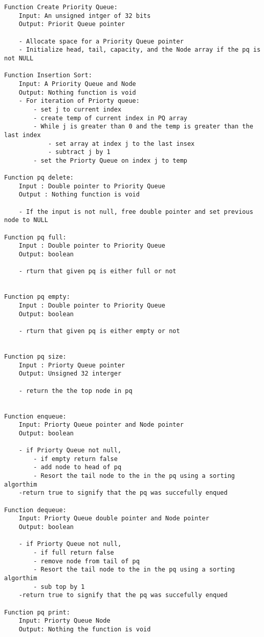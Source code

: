 \documentclass[11pt]{article} %
\begin{document}
\begin{flushleft}
\begin{lstlisting}
Function Create Priority Queue:
    Input: An unsigned intger of 32 bits
    Output: Priorit Queue pointer
    
    - Allocate space for a Priority Queue pointer
    - Initialize head, tail, capacity, and the Node array if the pq is not NULL

Function Insertion Sort:
    Input: A Priority Queue and Node
    Output: Nothing function is void
    - For iteration of Priorty queue:
        - set j to current index
        - create temp of current index in PQ array
        - While j is greater than 0 and the temp is greater than the last index
            - set array at index j to the last insex
            - subtract j by 1
        - set the Priorty Queue on index j to temp

Function pq delete:
    Input : Double pointer to Priority Queue
    Output : Nothing function is void

    - If the input is not null, free double pointer and set previous node to NULL

Function pq full:
    Input : Double pointer to Priority Queue
    Output: boolean
    
    - rturn that given pq is either full or not


Function pq empty:
    Input : Double pointer to Priority Queue
    Output: boolean
    
    - rturn that given pq is either empty or not


Function pq size:
    Input : Priorty Queue pointer
    Output: Unsigned 32 interger
    
    - return the the top node in pq 


Function enqueue:
    Input: Priorty Queue pointer and Node pointer
    Output: boolean

    - if Priorty Queue not null, 
        - if empty return false
        - add node to head of pq
        - Resort the tail node to the in the pq using a sorting algorthim
    -return true to signify that the pq was succefully enqued 

Function dequeue:
    Input: Priorty Queue double pointer and Node pointer
    Output: boolean

    - if Priorty Queue not null, 
        - if full return false
        - remove node from tail of pq
        - Resort the tail node to the in the pq using a sorting algorthim
        - sub top by 1
    -return true to signify that the pq was succefully enqued 

Function pq print:
    Input: Priorty Queue Node
    Output: Nothing the function is void
    

\end{lstlisting}
\end{flushleft}
\end{document}
